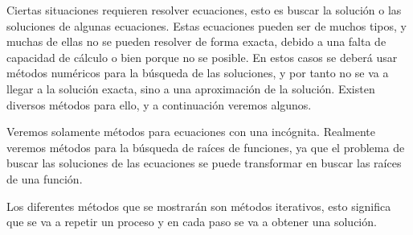 
Ciertas situaciones requieren resolver ecuaciones,
esto es buscar la solución o las soluciones de
algunas ecuaciones.
Estas ecuaciones pueden ser de muchos tipos,
y muchas de ellas no se pueden resolver de forma
exacta, debido a una falta de capacidad de cálculo
o bien porque no se posible.
En estos casos se deberá usar métodos numéricos
para la búsqueda de las soluciones, y por tanto
no se va a llegar a la solución exacta, sino a
una aproximación de la solución.
Existen diversos métodos para ello, y a continuación
veremos algunos.

Veremos solamente métodos para ecuaciones con una
incógnita.
Realmente veremos métodos para la búsqueda de raíces
de funciones, ya que el problema de buscar las
soluciones de las ecuaciones
se puede transformar en buscar las raíces de una
función.

Los diferentes métodos que se mostrarán son métodos
iterativos, esto significa que se va a repetir un
proceso y en cada paso se va a obtener una solución.
